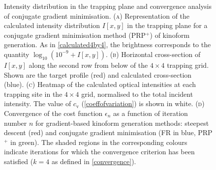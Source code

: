 \documentclass[../Thesis-IJspeert.tex]{subfiles}
\begin{document}
\begin{figure}[t]
	
	\caption[Intensity distribution in the trapping plane and convergence analysis of conjugate gradient minimisation]{Intensity distribution in the trapping plane and convergence analysis of conjugate gradient minimisation. \textsc{(a)} Representation of the calculated intensity distribution $I[x,y]$ in the trapping plane for a conjugate gradient minimisation method (PRP$^+$) of kinoform generation. As in \autoref{calculated4by4}, the brightness corresponds to the quantity $\log_{10}(10^{-9} + I[x,y])$. \textsc{(b)} Horizontal cross-section of $I[x,y]$ along the second row from below of the $4 \times 4$ trapping grid. Shown are the target profile (red) and calculated cross-section (blue). \textsc{(c)} Heatmap of the calculated optical intensities at each trapping site in the $4\times4$ grid, normalised to the total incident intensity. The value of $c_\mathrm{v}$ (\autoref{coeffofvariation}) is shown in white. \textsc{(d)} Convergence of the cost function $\epsilon_n$ as a function of iteration number $n$ for gradient-based kinoform generation methods: steepest descent (red) and conjugate gradient minimisation (FR in blue, PRP$^+$ in green). The shaded regions in the corresponding colours indicate iterations for which the convergence criterion has been satisfied ($k=4$ as defined in \autoref{convergence}).}
	\label{conjugategradient}
\end{figure}
\end{document}
